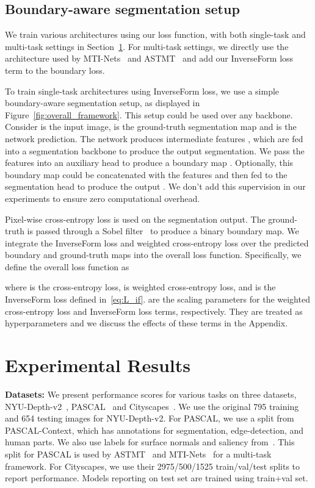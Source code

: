 \documentclass[final]{cvpr}
\begin{document}
\subsection{Boundary-aware segmentation setup}\label{sec:bd_aware_seg}

We train various architectures using our loss function, with both single-task and multi-task settings in Section~\ref{sec:experiment}. For multi-task settings, we directly use the architecture used by MTI-Nets~\cite{vandenhende2020mti} and ASTMT~\cite{maninis2019attentive} and add our InverseForm loss term to the boundary loss.
 
To train single-task architectures using InverseForm loss, we use a simple boundary-aware segmentation setup, as displayed in Figure~\ref{fig:overall_framework}. This setup could be used over any backbone. Consider  is the input image,  is the ground-truth segmentation map and  is the network prediction. The network produces intermediate features , which are fed into a segmentation backbone to produce the output segmentation. We pass the features  into an auxiliary head to produce a boundary map . Optionally, this boundary map could be concatenated with the features  and then fed to the segmentation head to produce the output . We don't add this supervision in our experiments to ensure zero computational overhead.

Pixel-wise cross-entropy loss  is used on the segmentation output. The ground-truth  is passed through a Sobel filter~\cite{canny1986computational} to produce a binary boundary map. We integrate the InverseForm loss and weighted cross-entropy loss  over the predicted boundary and ground-truth maps into the overall loss function. Specifically, we define the overall loss function as  

where  is the cross-entropy loss,  is weighted cross-entropy loss, and  is the InverseForm loss defined in~\eqref{eq:L_if}.  are the scaling parameters for the weighted cross-entropy loss and InverseForm loss terms, respectively. They are treated as hyperparameters and we discuss the effects of these terms in the Appendix. 


\section{Experimental Results}\label{sec:experiment}

\noindent\textbf{Datasets:} We present performance scores for various tasks on three datasets, NYU-Depth-v2~\cite{silberman2012indoor}, PASCAL~\cite{pascal2014} and Cityscapes~\cite{cordts2016cityscapes}. We use the original 795 training and 654 testing images for NYU-Depth-v2. For PASCAL, we use a split from PASCAL-Context, which has annotations for segmentation, edge-detection, and human parts. We also use labels for surface normals and saliency from~\cite{maninis2019attentive}. This split for PASCAL is used by ASTMT~\cite{maninis2019attentive} and MTI-Nets~\cite{vandenhende2020mti} for a multi-task framework. For Cityscapes, we use their 2975/500/1525 train/val/test splits to report performance. Models reporting on test set are trained using train+val set.
\end{document}
